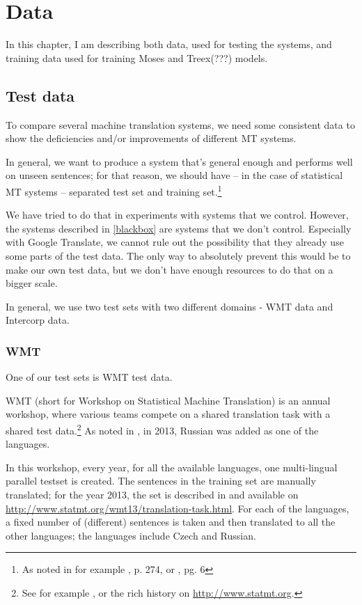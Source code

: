 \chapter{Data}
In this chapter, I am describing both data, used for testing the systems, and training data used for training Moses and Treex(???) models.

\section{Test data}
\label{testset}
To compare several machine translation systems, we need some consistent data to show the deficiencies and/or improvements of different MT systems.

In general, we want to produce a system that's general enough and performs well on unseen sentences; for that reason, we should have -- in the case of statistical MT systems -- separated test set and training set.\footnote{As noted in for example \cite{koehn2010statistical}, p. 274, or \cite{bishop}, pg. 6}

We have tried to do that in experiments with systems that we control. However, the systems described in \ref{blackbox} are systems that we don't control. Especially with Google Translate, we cannot rule out the possibility that they already use some parts of the test data. The only way to absolutely prevent this would be to make our own test data, but we don't have enough resources to do that on a bigger scale.

In general, we use two test sets with two different domains - WMT data and Intercorp data.

\subsection{WMT}
One of our test sets is WMT test data. 

WMT (short for Workshop on Statistical Machine Translation) is an annual workshop, where various teams compete on a shared translation task with a shared test data.\footnote{See for example \cite{wmt_findings_2013}, or the rich history on \url{http://www.statmt.org}.} As noted in \cite{wmt_findings_2013}, in 2013, Russian was added as one of the languages. 

In this workshop, every year, for all the available languages, one multi-lingual parallel testset is created. 
The sentences in the training set are manually translated; for the year 2013, the set is described in \cite{wmt_findings_2013} and available on \url{http://www.statmt.org/wmt13/translation-task.html}. For each of the languages, a fixed number of (different) sentences is taken and then translated to all the other languages; the languages include Czech and Russian.

